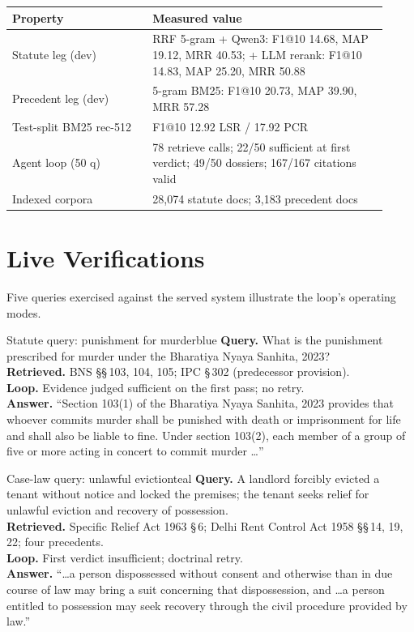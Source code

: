 \documentclass{mnnit}
\makeatletter
\newcommand{\tabcaption}[1]{\def\@captype{table}\caption{#1}}
\makeatother
\begin{document}
\begin{center}
\small
\tabcaption{The assembled system as measured. Retrieval rows are
development-split; the test row is the test-split BM25 run.}
\label{tab:sys}
\vspace{2mm}
\begin{tabular}{p{0.34\linewidth}p{0.58\linewidth}}
\toprule
Property & Measured value \\
\midrule
Statute leg (dev) & RRF 5-gram + Qwen3: F1@10 14.68, MAP 19.12,
MRR 40.53; + LLM rerank: F1@10 14.83, MAP 25.20, MRR 50.88 \\
Precedent leg (dev) & 5-gram BM25: F1@10 20.73, MAP 39.90,
MRR 57.28 \\
Test-split BM25 rec-512 & F1@10 12.92 LSR / 17.92 PCR \\
Agent loop (50 q) & 78 retrieve calls; 22/50 sufficient at first
verdict; 49/50 dossiers; 167/167 citations valid \\
Indexed corpora & 28,074 statute docs; 3,183 precedent docs \\
\bottomrule
\end{tabular}
\end{center}

\section{Live Verifications}
Five queries exercised against the served system illustrate the
loop's operating modes.

\begin{livebox}{Statute query: punishment for murder}{blue}
\textbf{Query.} What is the punishment prescribed for murder
under the Bharatiya Nyaya Sanhita, 2023?\\
\textbf{Retrieved.} BNS \S\S\,103, 104, 105; IPC \S\,302
(predecessor provision).\\
\textbf{Loop.} Evidence judged sufficient on the first pass; no
retry.\\
\textbf{Answer.} ``Section 103(1) of the Bharatiya Nyaya
Sanhita, 2023 provides that whoever commits murder shall be
punished with death or imprisonment for life and shall also be
liable to fine. Under section 103(2), each member of a group of
five or more acting in concert to commit murder \ldots''
\end{livebox}

\begin{livebox}{Case-law query: unlawful eviction}{teal}
\textbf{Query.} A landlord forcibly evicted a tenant without
notice and locked the premises; the tenant seeks relief for
unlawful eviction and recovery of possession.\\
\textbf{Retrieved.} Specific Relief Act 1963 \S\,6; Delhi Rent
Control Act 1958 \S\S\,14, 19, 22; four precedents.\\
\textbf{Loop.} First verdict insufficient; doctrinal retry.\\
\textbf{Answer.} ``\ldots a person dispossessed without consent
and otherwise than in due course of law may bring a suit
concerning that dispossession, and \ldots a person entitled to
possession may seek recovery through the civil procedure
provided by law.''
\end{livebox}
\end{document}
